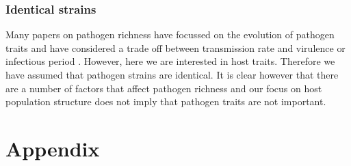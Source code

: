 \subsubsection{Identical strains}

Many papers on pathogen richness have focussed on the evolution of pathogen traits and have considered a trade off between transmission rate and virulence \cite{nowak1994superinfection, nowak1994superinfection} or infectious period \cite{poletto2013hostinfec}.
However, here we are interested in host traits.
Therefore we have assumed that pathogen strains are identical.
It is clear however that there are a number of factors that affect pathogen richness and our focus on host population structure does not imply that pathogen traits are not important.




\clearpage
\section{Appendix}


